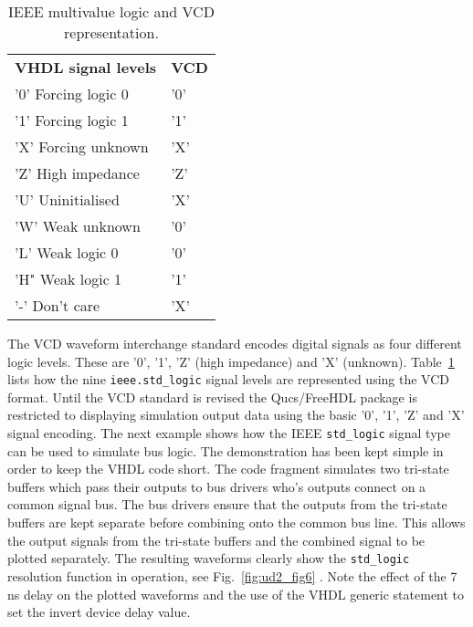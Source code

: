 \begin{table}
\centering
\begin{center}
\begin{tabular}{ll}
\textbf{VHDL signal levels} & \textbf{VCD } \\ 
'0'   Forcing logic 0 &    '0'\\ 
'1'   Forcing logic 1 &       '1' \\  
'X'   Forcing unknown &       'X' \\ 
'Z'   High impedance & 'Z' \\ 
'U'   Uninitialised & 'X' \\ 
'W'  Weak unknown & '0' \\ 
'L'   Weak logic 0 & '0' \\ 
'H"  Weak logic 1 & '1' \\ 
'-'    Don't care &  'X'
\end{tabular}
\end{center}

\caption{IEEE multivalue logic and VCD representation.}
\label{tab:tab7}
\end{table}






The VCD waveform interchange standard encodes digital signals as four different logic levels.  These are '0', '1', 'Z' (high impedance) and 'X' (unknown).  Table~\ref{tab:tab7} lists how the nine \verb|ieee.std_logic| signal levels are represented using the VCD format.  Until the VCD standard is revised the Qucs/FreeHDL package is restricted to displaying simulation output data using the basic '0', '1', 'Z' and 'X' signal encoding.  The next example shows how the IEEE \verb|std_logic| signal type can be used to simulate bus logic.  The demonstration has been kept simple in order to keep the VHDL code short. The  code fragment simulates two tri-state buffers which pass their outputs to bus drivers who's outputs connect on a common signal bus.  The bus drivers ensure that the outputs from the tri-state buffers are kept separate before combining onto the common bus line.  This allows the output signals from the tri-state buffers and the combined signal to be plotted separately.  The resulting waveforms clearly show the \verb|std_logic| resolution function in operation, see Fig.~\ref{fig:ud2_fig6} .  Note the effect of the 7 ns delay on the plotted waveforms and the use of the VHDL generic statement to set the invert device delay value.

